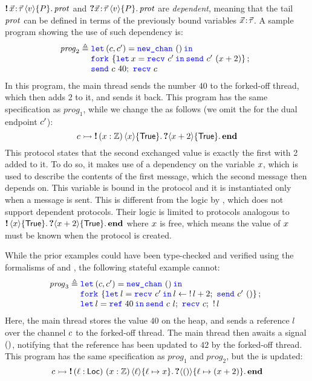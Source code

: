 \Pname $\sendprot \xdots \val \iprop \prot$ and
$\recvprot \xdots \val \iprop \prot$ are \emph{dependent}, meaning that
the tail $\mathit{prot}$ can be defined in terms of the previously bound variables $\vec{x}\!:\!\vec{\tau}$.
A sample program showing the use of such dependency is:
\[
{\mathit {prog}_2}\eqdef
\begin{array}[t]{@{} l}
\Let {(\chan, \chan')} = \newchan in \\
\Fork{ \Let {\var} = \recv {\chan'} in {\send {\chan'} (\var + 2 )} }; \\
\send \chan 40;\ \recv \chan
\end{array}
\]
In this program, the main thread sends the number $40$ to the forked-off thread, which then adds 2 to it, and sends it back.
This program has the same specification as ${\mathit prog}_1$, while we change the
\pnameSingular as follows (we omit the \pnameSingular for the dual endpoint $c'$):
\[
\interp{\chan}{\sendprot{(\var:\integer)}{\var}{\TRUE}{\recvprot{}{\var+2}{\TRUE} \protend}}
\]
This protocol states that the second exchanged value is exactly the first with 2 added to it.
To do so, it makes use of a dependency on the variable $x$, which is
used to describe the contents of the first message, which the second message then
depends on.
This variable is bound in the protocol and it is instantiated only when a message is sent.
This is different from the logic by \citet{cracium-ICECCS2015}, which does not support dependent protocols.
Their logic is limited to protocols analogous to $\sendprot{}{\var}{\TRUE} \recvprot{}{\var+2}{\TRUE} \protend$ where $x$ is free, which means the value of $x$ must be known when the protocol is created.

While the prior examples could have been type-checked and verified using
the formalisms of \citet{bocchi-CONCUR2010} and \citet{cracium-ICECCS2015},
the following stateful example cannot:
\[
{\mathit {prog}_3}\eqdef
\begin{array}[t]{@{} l}
  \Let {(\chan,\chan')} = \newchan in \\
  \Fork{\Let{l} = \recv{\chan'} in l \leftarrow \deref{l} + 2;\ \send {\chan'} {\TT}}; \\
  \Let l = \newref{40} in \send{\chan}{l};\ \recv {\chan};\ \deref l
\end{array}
\]
Here, the main thread stores the value $40$ on the heap, and sends a
reference $l$ over the channel $c$ to the forked-off thread.
The main thread then awaits a signal $()$, notifying that the
reference has been updated to $42$ by the forked-off thread.
This program has the same specification as ${\mathit prog}_1$ and ${\mathit prog}_2$, but the \pnameSingular is updated:
\[
\interp{\chan}{\sendprot{(\loc: \Loc)\ (\var:\integer)}{\loc}{\loc \mapsto \var}
               \recvprot{}{\TT}{\loc \mapsto (\var+2)}
               \protend}
\]

